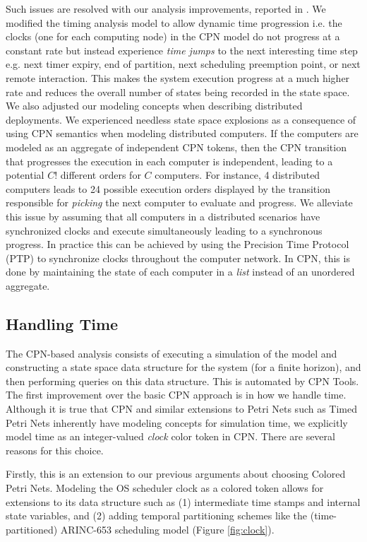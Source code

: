 Such issues are resolved with our analysis improvements, reported in \cite{SEUS}. We modified the timing analysis model to allow dynamic time progression i.e. the clocks (one for each computing node) in the CPN model do not progress at a constant rate but instead experience \emph{time jumps} to the next interesting time step e.g. next timer expiry, end of partition, next scheduling preemption point, or next remote interaction. This makes the system execution progress at a much higher rate and reduces the overall number of states being recorded in the state space. We also adjusted our modeling concepts when describing distributed deployments. We experienced needless state space explosions as a consequence of using CPN semantics when modeling distributed computers. If the computers are modeled as an aggregate of independent CPN tokens, then the CPN transition that progresses the execution in each computer is independent, leading to a potential $C!$ different orders for $C$ computers. For instance, 4 distributed computers leads to 24 possible execution orders displayed by the transition responsible for \emph{picking} the next computer to evaluate and progress. We alleviate this issue by assuming that all computers in a distributed scenarios have synchronized clocks and execute simultaneously leading to a synchronous progress. In practice this can be achieved by using the Precision Time Protocol (PTP) \cite{correll2005design} to synchronize clocks throughout the computer network. In CPN, this is done by maintaining the state of each computer in a \emph{list} instead of an unordered aggregate. 

\subsection{Handling Time}
\label{handling_time}

The CPN-based analysis consists of executing a simulation of the model and constructing a state space data structure for the system (for a finite horizon), and then performing queries on this data structure. This is automated by CPN Tools. The first improvement over the basic CPN approach is in how we handle time. Although it is true that CPN and similar extensions to Petri Nets such as Timed Petri Nets inherently have modeling concepts for simulation time, we explicitly model time as an integer-valued \emph{clock} color token in CPN. There are several reasons for this choice. 

Firstly, this is an extension to our previous arguments about choosing Colored Petri Nets. Modeling the OS scheduler clock as a colored token allows for extensions to its data structure such as (1) intermediate time stamps and internal state variables, and (2) adding temporal partitioning schemes like the (time-partitioned) ARINC-653 \cite{ARINC-653} scheduling model (Figure \ref{fig:clock}). 

